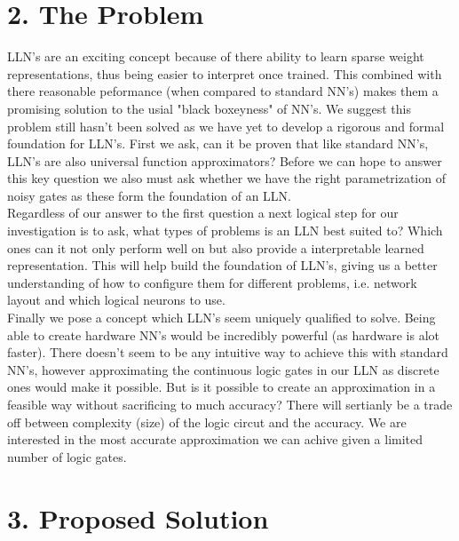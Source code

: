 \documentclass[11pt, a4paper, twoside, openright]{report}
\begin{document}
\section*{2. The Problem}

LLN's are an exciting concept because of there ability to learn sparse weight representations, thus being easier to interpret once trained. This combined with there reasonable peformance (when compared to standard NN's) makes them a promising solution to the usial "black boxeyness" of NN's. We suggest this problem still hasn't been solved as we have yet to develop a rigorous and formal foundation for LLN's. First we ask, can it be proven that like standard NN's, LLN's are also universal function approximators?  Before we can hope to answer this key question we also must ask whether we have the right parametrization of noisy gates as these form the foundation of an LLN. \\

Regardless of our answer to the first question a next logical step for our investigation is to ask, what types of problems is an LLN best suited to? Which ones can it not only perform well on but also provide a interpretable learned representation. This will help build the foundation of LLN's, giving us a better understanding of how to configure them for different problems, i.e. network layout and which logical neurons to use.\\

Finally we pose a concept which LLN's seem uniquely qualified to solve. Being able to create hardware NN's would be incredibly powerful (as hardware is alot faster). There doesn't seem to be any intuitive way to achieve this with standard NN's, however approximating the continuous logic gates in our LLN as discrete ones would make it possible. But is it possible to create an approximation in a feasible way without sacrificing to much accuracy? There will sertianly be a trade off between complexity (size) of the logic circut and the accuracy. We are interested in the most accurate approximation we can achive given a limited number of logic gates.

\section*{3. Proposed Solution}
\end{document}
